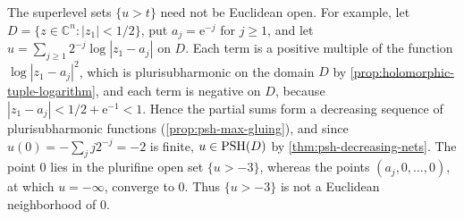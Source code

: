 The superlevel sets $\{u>t\}$ need not be Euclidean open. For example, let $D=\{z\in\mathbb C^n:|z_1|<1/2\}$, put $a_j=\mathrm e^{-j}$ for $j\ge1$, and let $u=\sum_{j\ge1}2^{-j}\log|z_1-a_j|$ on $D$. Each term is a positive multiple of the function $\log|z_1-a_j|^2$, which is plurisubharmonic on the domain $D$ by \cref{prop:holomorphic-tuple-logarithm}, and each term is negative on $D$, because $|z_1-a_j|<1/2+\mathrm e^{-1}<1$. Hence the partial sums form a decreasing sequence of plurisubharmonic functions (\cref{prop:psh-max-gluing}), and since $u(0)=-\sum_jj2^{-j}=-2$ is finite, $u\in\mathrm{PSH}(D)$ by \cref{thm:psh-decreasing-nets}. The point $0$ lies in the plurifine open set $\{u>-3\}$, whereas the points $(a_j,0,\ldots,0)$, at which $u=-\infty$, converge to $0$. Thus $\{u>-3\}$ is not a Euclidean neighborhood of $0$.

